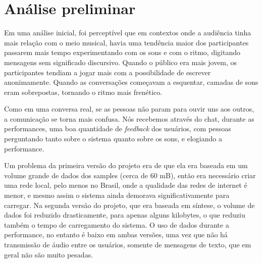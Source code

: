\section{Análise preliminar}


Em uma análise inicial, foi perceptível que em contextos onde a audiência tinha mais relação com o meio musical, havia uma tendência maior dos participantes passarem mais tempo experimentando com os sons e com o ritmo, digitando mensagens sem significado discursivo. Quando o público era mais jovem, os participantes tendiam a jogar mais com a possibilidade de escrever anonimamente. Quando as conversações começavam a esquentar, camadas de sons eram sobrepostas, tornando o ritmo mais frenético.

Como em uma conversa real, se as pessoas não param para ouvir uns aos outros, a comunicação se torna mais confusa. Nós recebemos através do chat, durante as performances, uma boa quantidade de \emph{feedback} dos usuários, com pessoas perguntando tanto sobre o sistema quanto sobre os sons, e elogiando a performance.



Um problema da primeira versão do projeto era de que ela era baseada em um volume grande de dados dos samples (cerca de 60 mB), então era necessário criar uma rede local, pelo menos no Brasil, onde a qualidade das redes de internet é menor, e mesmo assim o sistema ainda demorava significativamente para carregar. Na segunda versão do projeto, que era baseada em síntese, o volume de dados foi reduzido drasticamente, para apenas alguns kilobytes, o que reduziu também o tempo de carregamento do sistema. O uso de dados durante a performance, no entanto é baixo em ambas versões, uma vez que não há transmissão de áudio entre os usuários, somente de mensagens de texto, que em geral não são muito pesadas. 

